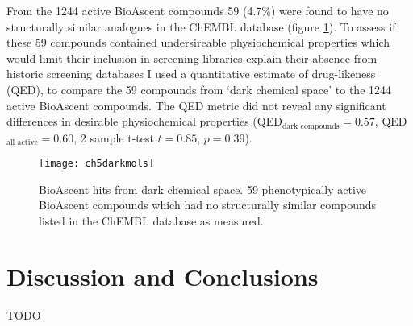 \documentclass[a4paper,11pt,twoside,openright]{scrbook}
\begin{document}
From the 1244 active BioAscent compounds 59 (4.7\%) were found to have no structurally similar analogues in the ChEMBL database (figure \ref{figure:dark_mols}).
To assess if these 59 compounds contained undersireable physiochemical properties which would limit their inclusion in screening libraries explain their absence from historic screening databases I used a quantitative estimate of drug-likeness (QED), \cite{Bickerton2012} to compare the 59 compounds from `dark chemical space' to the 1244 active BioAscent compounds.
The QED metric did not reveal any significant differences in desirable physiochemical properties (QED$_{\text{dark compounds}} = 0.57$,  QED$_{\text{all active}} = 0.60$, 2 sample t-test $t=0.85$, $p=0.39$).


\begin{figure}
    \captionsetup{width=1.0\textwidth}
    \caption[BioAscent hits from dark chemical space]{
BioAscent hits from dark chemical space.
59 phenotypically active BioAscent compounds which had no structurally similar compounds listed in the ChEMBL database as measured.
}
    \texttt{[image: ch5darkmols]}
    \label{figure:dark_mols}
\end{figure}







\section{Discussion and Conclusions}
TODO






\end{document}
